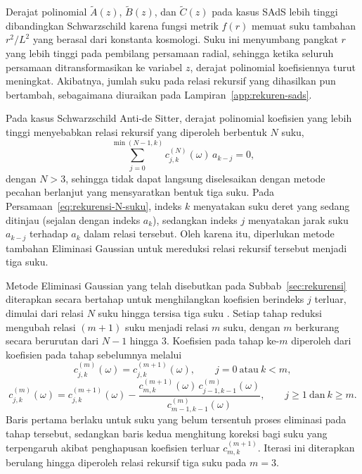 Derajat polinomial $\widetilde{A}(z)$, $\widetilde{B}(z)$, dan $\widetilde{C}(z)$
pada kasus SAdS lebih tinggi dibandingkan Schwarzschild karena fungsi metrik $f(r)$ memuat
suku tambahan $r^2/L^2$ yang berasal dari konstanta kosmologi. Suku ini menyumbang pangkat
$r$ yang lebih tinggi pada pembilang persamaan radial, sehingga ketika seluruh persamaan
ditransformasikan ke variabel $z$, derajat polinomial koefisiennya turut meningkat.
Akibatnya, jumlah suku pada relasi rekursif yang dihasilkan pun bertambah, sebagaimana
diuraikan pada Lampiran~\ref{app:rekuren-sads}.

Pada kasus Schwarzschild Anti-de Sitter, derajat polinomial koefisien yang lebih tinggi menyebabkan relasi rekursif yang diperoleh berbentuk $N$ suku,
\begin{equation}
    \sum_{j=0}^{\min(N-1,k)} c_{j,k}^{(N)}(\omega)\, a_{k-j} = 0,
    \label{eq:rekurensi-N-suku}
\end{equation}
dengan $N>3$, sehingga tidak dapat langsung diselesaikan dengan metode pecahan berlanjut yang mensyaratkan bentuk tiga suku. Pada Persamaan~\eqref{eq:rekurensi-N-suku}, indeks $k$ menyatakan suku deret yang sedang ditinjau (sejalan dengan indeks $a_k$), sedangkan indeks $j$ menyatakan jarak suku $a_{k-j}$ terhadap $a_k$ dalam relasi tersebut. Oleh karena itu, diperlukan metode tambahan Eliminasi Gaussian untuk mereduksi relasi rekursif tersebut menjadi tiga suku.

Metode Eliminasi Gaussian yang telah disebutkan pada Subbab~\ref{sec:rekurensi} diterapkan secara bertahap untuk menghilangkan koefisien berindeks $j$ terluar, dimulai dari relasi $N$ suku hingga tersisa tiga suku \parencite{Konoplya2011}. Setiap tahap reduksi mengubah relasi $(m+1)$ suku menjadi relasi $m$ suku, dengan $m$ berkurang secara berurutan dari $N-1$ hingga $3$. Koefisien pada tahap ke-$m$ diperoleh dari koefisien pada tahap sebelumnya melalui
\begin{equation}
    c_{j,k}^{(m)}(\omega) = c_{j,k}^{(m+1)}(\omega), \qquad j=0 \ \text{atau}\ k<m,
\end{equation}
\begin{equation}
    c_{j,k}^{(m)}(\omega) = c_{j,k}^{(m+1)}(\omega)
    - \frac{c_{m,k}^{(m+1)}(\omega)\, c_{j-1,k-1}^{(m)}(\omega)}{c_{m-1,k-1}^{(m)}(\omega)},
    \qquad j\geq 1 \ \text{dan}\ k\geq m.
\end{equation}
Baris pertama berlaku untuk suku yang belum tersentuh proses eliminasi pada tahap tersebut, sedangkan baris kedua menghitung koreksi bagi suku yang terpengaruh akibat penghapusan koefisien terluar $c_{m,k}^{(m+1)}$. Iterasi ini diterapkan berulang hingga diperoleh relasi rekursif tiga suku pada $m=3$.

